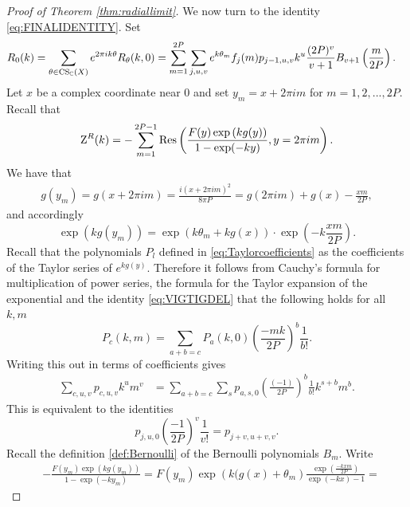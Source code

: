 \begin{proof}[Proof of Theorem \ref{thm:radiallimit}]
We now turn to the identity \eqref{eq:FINALIDENTITY}.  Set
\begin{align} \begin{split}  \label{eq:MUAHAH}
R_0(k)&=\sum_{\theta \in \operatorname{CS}_{\mathbb{C}}(X)} e^{2\pi ik\theta} R_{\theta}(k,0)= \sum_{m=1}^{2P} \sum_{j,u,v} e^{k\theta_m}  f_j(m) p_{j-1,u,v} k^u    \frac{(2P)^{v}}{v+1}  B_{v+1}\left(\frac{m}{2P}\right).
\end{split}
\end{align}
Let $x$ be a complex coordinate near $0$ and set $y_m=x+2\pi i m$ for $m=1,2,...,2P$. Recall that
\begin{equation}
\operatorname{Z}^R(k)=- \sum_{m=1}^{2P-1}  \operatorname{Res}\left(  \frac{F(y)\exp\left(kg(y)\right)}{1-\exp(-ky)} , y=2\pi im \right).
\end{equation} 
We have that
\begin{align} \label{eq:vigtigdel}
g(y_m)=g(x+ 2\pi im)=\frac{i(x+2\pi i m)^2}{8\pi P}= g(2\pi im)+g(x)-\frac{xm}{2P},
\end{align}
and accordingly
\begin{equation} \label{eq:VIGTIGDEL}
\exp(kg(y_m) )=\exp\left(k\theta_m+kg(x) \right) \cdot \exp\left(- k\frac{xm}{2P}\right).
\end{equation}
Recall that the polynomials $P_l$ defined in \eqref{eq:Taylorcoefficients} as the coefficients of the Taylor series of $e^{kg(y)}$. Therefore it follows from Cauchy's formula for multiplication of power series, the formula for the Taylor expansion of the exponential and the identity \eqref{eq:VIGTIGDEL} that the following  holds for all $k ,m$
\begin{equation} 
P_c(k,m)= \sum_{a+b=c} P_a(k,0)\left(\frac{-mk}{2P}\right)^b \frac{1}{b!}.
\end{equation}
Writing this out in terms of coefficients gives
\begin{align}
\sum_{c,u,v} p_{c,u,v} k^u m^v &= \sum_{a+b=c} \sum_{s} p_{a,s,0} \left( \frac{(-1)}{2P} \right)^b \frac{1}{b!} k^{s+b} m^b.
\end{align}
This is equivalent to the identities
\begin{equation} \label{eq:MAASTERIDENTITY}
p_{j,u,0} \left( \frac{-1}{2P} \right)^v \frac{1}{v!}= p_{j+v,u+v,v}.
\end{equation}
Recall the definition \eqref{def:Bernoulli} of the Bernoulli polynomials $B_m$. Write
\begin{align}
&- \frac{F(y_m)\exp\left(kg(y_m)\right)}{1-\exp(-ky_m)} =F(y_m) \exp\left(k(g(x)+\theta_m\right) \frac{\exp\left(\frac{-kxm}{2P} \right)}{\exp(-kx)-1}=

\end{align}
\end{proof}
